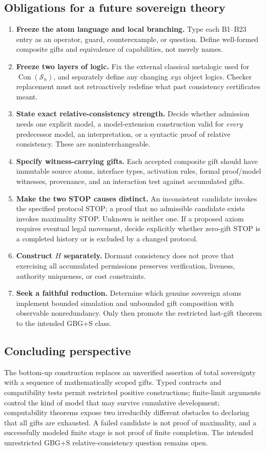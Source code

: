 \documentclass[11pt,letterpaper]{article}
\theoremstyle{definition}\newtheorem{definition}[theorem]{Definition}\newtheorem{example}[theorem]{Example}
\theoremstyle{remark}\newtheorem{remark}[theorem]{Remark}
\newcommand{\Con}{\operatorname{Con}}
\newcommand{\Stage}{\mathcal{S}}
\begin{document}
\subsection{Obligations for a future sovereign theory}
\begin{enumerate}
\item \textbf{Freeze the atom language and local branching.} Type each B1--B23 entry as an operator, guard, counterexample, or question. Define well-formed composite gifts and equivalence of capabilities, not merely names.
\item \textbf{Freeze two layers of logic.} Fix the external classical metalogic used for $\Con(\Stage_n)$, and separately define any changing $xyz$ object logics. Checker replacement must not retroactively redefine what past consistency certificates meant.
\item \textbf{State exact relative-consistency strength.} Decide whether admission needs one explicit model, a model-extension construction valid for \emph{every} predecessor model, an interpretation, or a syntactic proof of relative consistency. These are noninterchangeable.
\item \textbf{Specify witness-carrying gifts.} Each accepted composite gift should have immutable source atoms, interface types, activation rules, formal proof/model witnesses, provenance, and an interaction test against accumulated gifts.
\item \textbf{Make the two STOP causes distinct.} An inconsistent candidate invokes the specified protocol STOP; a proof that no admissible candidate exists invokes maximality STOP. Unknown is neither one. If a proposed axiom requires eventual legal movement, decide explicitly whether zero-gift STOP is a completed history or is excluded by a changed protocol.
\item \textbf{Construct $H$ separately.} Dormant consistency does not prove that exercising all accumulated permissions preserves verification, liveness, authority uniqueness, or cost constraints.
\item \textbf{Seek a faithful reduction.} Determine which genuine sovereign atoms implement bounded simulation and unbounded gift composition with observable nonredundancy. Only then promote the restricted last-gift theorem to the intended GBG+S class.
\end{enumerate}


\subsection{Concluding perspective}
The bottom-up construction replaces an unverified assertion of total sovereignty with a sequence of mathematically scoped gifts. Typed contracts and compatibility tests permit restricted positive constructions; finite-limit arguments control the kind of model that may survive cumulative development; computability theorems expose two irreducibly different obstacles to declaring that all gifts are exhausted. A failed candidate is not proof of maximality, and a successfully modeled finite stage is not proof of finite completion. The intended unrestricted GBG+S relative-consistency question remains open.
\end{document}
